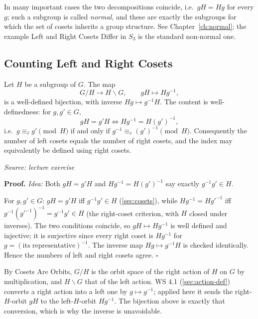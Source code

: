 \documentclass[11pt]{report}
\renewenvironment{proof}[1][Proof]{\noindent\textbf{#1.} }{\hfill$\square$\par\vspace{5pt}}
\newcommand{\srcline}[1]{\par\hfill{\footnotesize\textit{Source: #1}}}
\begin{document}
\begin{rembox}\label{rem:normal-subgroups}
In many important cases the two decompositions coincide, i.e.\ $gH = Hg$ for every $g$; such a subgroup is called \emph{normal}, and these are exactly the subgroups for which the set of cosets inherits a group structure. See Chapter~\ref{ch:normal}; the example Left and Right Cosets Differ in $S_3$ is the standard non-normal one.
\end{rembox}


\subsection{Counting Left and Right Cosets}\label{sec:leftright}

\begin{propbox}\label{prop:natural-bijection-g-h-to-h-g}
Let $H$ be a subgroup of $G$. The map
\[ G/H \longrightarrow H\backslash G, \qquad gH \longmapsto Hg^{-1}, \]
is a well-defined bijection, with inverse $Hg \mapsto g^{-1}H$. The content is well-definedness: for $g, g' \in G$,
\[ gH = g'H \iff Hg^{-1} = H(g')^{-1}, \]
i.e.\ $g \equiv_\ell g' \pmod H$ if and only if $g^{-1} \equiv_r (g')^{-1} \pmod H$. Consequently the number of left cosets equals the number of right cosets, and the index may equivalently be defined using right cosets.
\srcline{lecture exercise}
\end{propbox}

\begin{proof}
\textit{Idea:} Both $gH = g'H$ and $Hg^{-1} = H(g')^{-1}$ say exactly $g^{-1}g' \in H$.\par
For $g, g' \in G$: $gH = g'H$ iff $g^{-1}g' \in H$ (\ref{sec:cosets}), while $Hg^{-1} = Hg'^{-1}$ iff $g^{-1}(g'^{-1})^{-1} = g^{-1}g' \in H$ (the right-coset criterion, with $H$ closed under inverses). The two conditions coincide, so $gH \mapsto Hg^{-1}$ is well defined and injective; it is surjective since every right coset is $Hg^{-1}$ for $g = (\text{its representative})^{-1}$. The inverse map $Hg \mapsto g^{-1}H$ is checked identically. Hence the numbers of left and right cosets agree.
\end{proof}

\begin{rembox}[{This Is WS 4.1}]\label{rem:this-ws-4-1}
By Cosets Are Orbits, $G/H$ is the orbit space of the right action of $H$ on $G$ by multiplication, and $H\backslash G$ that of the left action. WS 4.1 (\ref{sec:action-def}) converts a right action into a left one by $g \mapsto g^{-1}$; applied here it sends the right-$H$-orbit $gH$ to the left-$H$-orbit $Hg^{-1}$. The bijection above is exactly that conversion, which is why the inverse is unavoidable.
\end{rembox}
\end{document}

